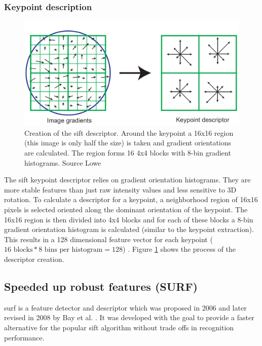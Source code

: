 \subsubsection*{Keypoint description}
\begin{figure}[ht]
	\centering
	\includegraphics[scale=0.2]{figures/theorySIFT_descriptor}
	\caption{Creation of the \gls{sift} descriptor. Around the keypoint a 16x16 region {(this image is only half the size)} is taken and gradient orientations are calculated. The region forms 16 4x4 blocks with 8-bin gradient histograms. Source Lowe \cite{Lowe2004}}
	\label{fig:siftDescriptor}
\end{figure}
The \gls{sift} keypoint descriptor relies on gradient orientation histograms. They are more stable features than just raw intensity values and less sensitive to 3D rotation. To calculate a descriptor for a keypoint, a neighborhood region of 16x16 pixels is selected oriented along the dominant orientation of the keypoint. The 16x16 region is then divided into 4x4 blocks and for each of these blocks a 8-bin gradient orientation histogram is calculated {(similar to the keypoint extraction)}. This results in a 128 dimensional feature vector for each keypoint {($16\text{ blocks}*8\text{ bins per histogram}=128$)} \cite{Lowe2004}. Figure \ref{fig:siftDescriptor} shows the process of the descriptor creation.

\subsection[SURF]{Speeded up robust features (SURF)}
\label{subsec:surf}
\gls{surf} is a feature detector and descriptor which was proposed in 2006 \cite{Bay2006} and later revised in 2008 by Bay et al. \cite{Bay2008}. It was developed with the goal to provide a faster alternative for the popular \gls{sift} algorithm without trade offs in recognition performance.

